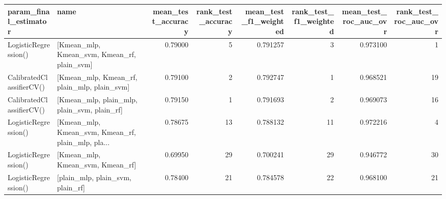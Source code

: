\begin{tabular}{llrrrrrr}
\toprule
   param\_final\_estimator &                                               name &  mean\_test\_accuracy &  rank\_test\_accuracy &  mean\_test\_f1\_weighted &  rank\_test\_f1\_weighted &  mean\_test\_roc\_auc\_ovr &  rank\_test\_roc\_auc\_ovr \\
\midrule
    LogisticRegression() &        [Kmean\_mlp, Kmean\_svm, Kmean\_rf, plain\_svm] &             0.79000 &                   5 &               0.791257 &                      3 &               0.973100 &                      1 \\
CalibratedClassifierCV() &        [Kmean\_mlp, Kmean\_rf, plain\_mlp, plain\_svm] &             0.79100 &                   2 &               0.792747 &                      1 &               0.968521 &                     19 \\
CalibratedClassifierCV() &        [Kmean\_mlp, plain\_mlp, plain\_svm, plain\_rf] &             0.79150 &                   1 &               0.791693 &                      2 &               0.969073 &                     16 \\
    LogisticRegression() & [Kmean\_mlp, Kmean\_svm, Kmean\_rf, plain\_mlp, pla... &             0.78675 &                  13 &               0.788132 &                     11 &               0.972216 &                      4 \\
    LogisticRegression() &                   [Kmean\_mlp, Kmean\_svm, Kmean\_rf] &             0.69950 &                  29 &               0.700241 &                     29 &               0.946772 &                     30 \\
    LogisticRegression() &                   [plain\_mlp, plain\_svm, plain\_rf] &             0.78400 &                  21 &               0.784578 &                     22 &               0.968100 &                     21 \\
\bottomrule
\end{tabular}

